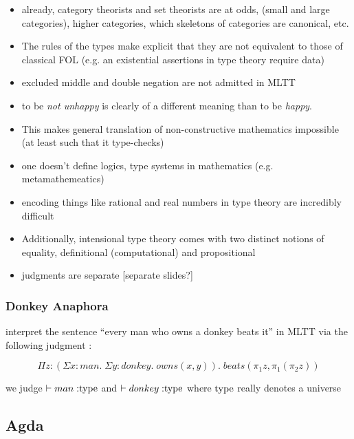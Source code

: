 \documentclass{beamer}
\begin{document}
\begin{frame}

\begin{itemize}

\item already, category theorists and set theorists are at odds, (small and
  large categories), higher categories, which skeletons of categories are canonical, etc.
\item The rules of the types make explicit that they are not equivalent to those
  of classical FOL (e.g. an existential assertions in type theory require data)
\item excluded middle and double negation are not admitted in MLTT
\item to be \emph{not unhappy} is clearly of a different meaning than to be \emph{happy}.
\item This makes general translation of non-constructive mathematics impossible  (at least such that it type-checks)

\item one doesn't define logics, type systems in mathematics (e.g. metamathemeatics)
\item encoding things like rational and real numbers in type theory are
  incredibly difficult
\item Additionally, intensional type theory comes with two distinct notions of equality,
definitional (computational) and propositional
\item judgments are separate [separate slides?]
\end{itemize}  

\end{frame}

\begin{frame}
\frametitle{Donkey Anaphora}

interpret the sentence ``every man who owns a donkey beats it'' in MLTT via the following judgment :

\[\Pi z : (\Sigma x : man. \; \Sigma y : donkey. \; owns(x,y)). \; beats(\pi_1z,\pi_1(\pi_2z))\]

we judge $\vdash man \; {:} {\rm type}$ and $\vdash donkey \; {:}
{\rm type}$ where ${\rm type}$ really denotes a universe

\end{frame}

\subsection{Agda}
\end{document}
